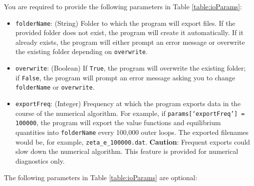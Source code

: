 \documentclass[12pt]{article}
\begin{document}
You are required to provide the following parameters in Table \ref{table:ioParams}:
\begin{itemize}
\item \texttt{folderName}: (String) Folder to which the program will export files. If the provided folder does not exist, the program will create it automatically. If it already exists, the program will either prompt an error message or overwrite the existing folder depending on \texttt{overwrite}.
\item \texttt{overwrite}: (Boolean) If \texttt{True}, the program will overwrite the existing folder; if \texttt{False}, the program will prompt an error message asking you to change \texttt{folderName} or \texttt{overwrite}.
\item \texttt{exportFreq}: (Integer) Frequency at which the program exports data in the course of the numerical algorithm. For example, if \texttt{params[`exportFreq'] = 100000}, the program will export the value functions and equilibrium quantities into \texttt{folderName} every  100,000 outer loops. The exported filenames would be, for example, \texttt{zeta\_e\_100000.dat}. \textbf{Caution}: Frequent exports could slow down the numerical algorithm. This feature is provided for numerical diagnostics only.
\end{itemize}
The following parameters in Table \ref{table:ioParams} are optional:
\end{document}
